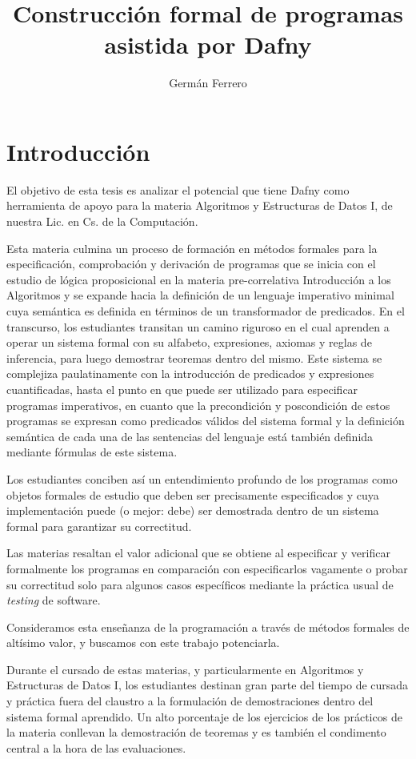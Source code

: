 \documentclass[12pt, a4paper, openany, fleqn]{book}
\author{Germán Ferrero}
\title{Construcción formal de programas asistida por Dafny}
\begin{document}
    \chapter{Introducción}
    El objetivo de esta tesis es analizar el potencial que tiene Dafny como herramienta de apoyo para la materia Algoritmos y Estructuras de Datos I, de nuestra Lic. en Cs. de la Computación.

    Esta materia culmina un proceso de formación en métodos formales para la especificación, comprobación y derivación de programas que se inicia con el estudio de lógica proposicional en la materia pre-correlativa Introducción a los Algoritmos y se expande hacia la definición de un lenguaje imperativo minimal cuya semántica es definida en términos de un transformador de predicados.
    En el transcurso, los estudiantes transitan un camino riguroso en el cual aprenden a operar un sistema formal con su alfabeto, expresiones, axiomas y reglas de inferencia, para luego demostrar teoremas dentro del mismo. Este sistema se complejiza paulatinamente con la introducción de predicados y expresiones cuantificadas, hasta el punto en que puede ser utilizado para especificar programas imperativos, en cuanto que la precondición y poscondición de estos programas se expresan como predicados válidos del sistema formal y la definición semántica de cada una de las sentencias del lenguaje está también definida mediante fórmulas de este sistema.

    Los estudiantes conciben así un entendimiento profundo de los programas como objetos formales de estudio que deben ser precisamente especificados y cuya implementación puede (o mejor: debe) ser demostrada dentro de un sistema formal para garantizar su correctitud.

    Las materias resaltan el valor adicional que se obtiene al especificar y verificar formalmente los programas en comparación con especificarlos vagamente o probar su correctitud solo para algunos casos específicos mediante la práctica usual de \textit{testing} de software.

    Consideramos esta enseñanza de la programación a través de métodos formales de altísimo valor, y buscamos con este trabajo potenciarla.

    Durante el cursado de estas materias, y particularmente en Algoritmos y Estructuras de Datos I, los estudiantes destinan gran parte del tiempo de cursada y práctica fuera del claustro a la formulación de demostraciones dentro del sistema formal aprendido. Un alto porcentaje de los ejercicios de los prácticos de la materia conllevan la demostración de teoremas y es también el condimento central a la hora de las evaluaciones.
\end{document}
